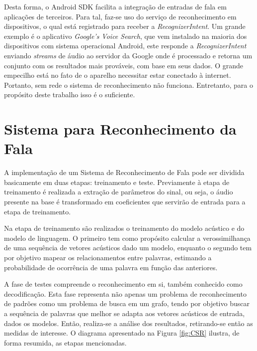 \documentclass[12pt,a4paper,oneside]{report}
\begin{document}
Desta forma, o Android SDK facilita a integração de entradas de fala em aplicações de terceiros. Para tal, faz-se uso do serviço de reconhecimento em dispositivos, o qual está registrado para receber a \emph{RecognizerIntent}\cite{recintent}. Um grande exemplo é o aplicativo \emph{Google's Voice Search}, que vem instalado na maioria dos dispositivos com sistema operacional Android, este responde a \emph{RecognizerIntent} enviando \emph{streams} de áudio ao servidor da Google onde é processado e retorna um conjunto com os resultados mais prováveis, com base em seus dados. O grande empecilho está no fato de o aparelho necessitar estar conectado à internet. Portanto, sem rede o sistema de reconhecimento não funciona. Entretanto, para o propósito deste trabalho isso é o suficiente.

\section{Sistema para Reconhecimento da Fala}

A implementação de um Sistema de Reconhecimento de Fala pode ser dividida basicamente em duas etapas: treinamento e teste. Previamente à etapa de treinamento é realizada a extração de parâmetros do sinal, ou seja, o áudio presente na base é transformado em coeficientes que servirão de entrada para a etapa de treinamento.

Na etapa de treinamento são realizados o treinamento do modelo acústico e do modelo de linguagem. O primeiro tem como propósito calcular a verossimilhança de uma sequência de vetores acústicos dado um modelo, enquanto o segundo tem por objetivo mapear os relacionamentos entre palavras, estimando a probabilidade de ocorrência de uma palavra em função das anteriores.

A fase de testes compreende o reconhecimento em si, também conhecido como decodificação. Esta fase representa não apenas um problema de reconhecimento de padrões como um problema de busca em um grafo, tendo por objetivo buscar a sequência de palavras que melhor se adapta aos vetores acústicos de entrada, dados os modelos. Então, realiza-se a análise dos resultados, retirando-se então as medidas de interesse. O diagrama apresentado na Figura \ref{fig:CSR} ilustra, de forma resumida, as etapas mencionadas.
\end{document}
